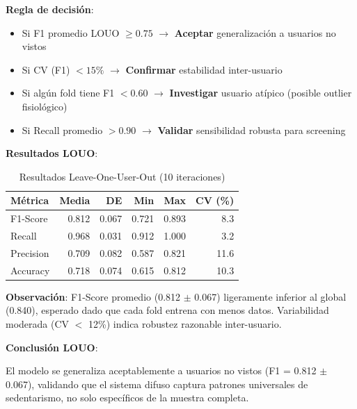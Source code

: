 \documentclass[12pt,letterpaper,twoside]{report}
\begin{document}
\begin{reglabox}
\textbf{Regla de decisión}:

\begin{itemize}[noitemsep]
    \item Si F1 promedio LOUO $\geq 0.75$ $\to$ \textbf{Aceptar} generalización a usuarios no vistos
    \item Si CV (F1) $< 15\%$ $\to$ \textbf{Confirmar} estabilidad inter-usuario
    \item Si algún fold tiene F1 $< 0.60$ $\to$ \textbf{Investigar} usuario atípico (posible outlier fisiológico)
    \item Si Recall promedio $> 0.90$ $\to$ \textbf{Validar} sensibilidad robusta para screening
\end{itemize}
\end{reglabox}

\begin{calculobox}
\textbf{Resultados LOUO}:

\begin{table}[H]
\centering
\caption{Resultados Leave-One-User-Out (10 iteraciones)}
\label{tab:louo_results}
\begin{tabular}{@{}lrrrrr@{}}
\toprule
\textbf{Métrica} & \textbf{Media} & \textbf{DE} & \textbf{Min} & \textbf{Max} & \textbf{CV (\%)} \\
\midrule
F1-Score         & 0.812 & 0.067 & 0.721 & 0.893 & 8.3 \\
Recall           & 0.968 & 0.031 & 0.912 & 1.000 & 3.2 \\
Precision        & 0.709 & 0.082 & 0.587 & 0.821 & 11.6 \\
Accuracy         & 0.718 & 0.074 & 0.615 & 0.812 & 10.3 \\
\bottomrule
\end{tabular}
\end{table}

\textbf{Observación}: F1-Score promedio (0.812 $\pm$ 0.067) ligeramente inferior al global (0.840), esperado dado que cada fold entrena con menos datos. Variabilidad moderada (CV $<$ 12\%) indica robustez razonable inter-usuario.
\end{calculobox}

\begin{decisionbox}
\textbf{Conclusión LOUO}:

El modelo se generaliza aceptablemente a usuarios no vistos (F1 = 0.812 $\pm$ 0.067), validando que el sistema difuso captura patrones universales de sedentarismo, no solo específicos de la muestra completa.
\end{decisionbox}
\end{document}
